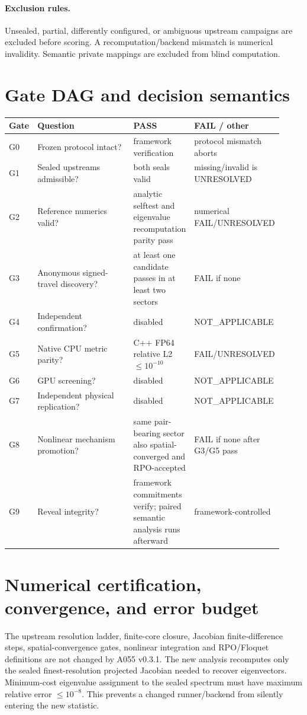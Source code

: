 \documentclass[11pt,a4paper]{article}
\begin{document}
\paragraph{Exclusion rules.}
Unsealed, partial, differently configured, or ambiguous upstream campaigns are excluded before scoring. A recomputation/backend mismatch is numerical invalidity. Semantic private mappings are excluded from blind computation.

\section{Gate DAG and decision semantics}
\begin{longtable}{p{0.07\linewidth}p{0.42\linewidth}p{0.22\linewidth}p{0.21\linewidth}}
\toprule Gate & Question & PASS & FAIL / other \\
\midrule
G0 & Frozen protocol intact? & framework verification & protocol mismatch aborts \\
G1 & Sealed upstreams admissible? & both seals valid & missing/invalid is UNRESOLVED \\
G2 & Reference numerics valid? & analytic selftest and eigenvalue recomputation parity pass & numerical FAIL/UNRESOLVED \\
G3 & Anonymous signed-travel discovery? & at least one candidate passes in at least two sectors & FAIL if none \\
G4 & Independent confirmation? & disabled & NOT\_APPLICABLE \\
G5 & Native CPU metric parity? & C++ FP64 relative L2 $\le10^{-10}$ & FAIL/UNRESOLVED \\
G6 & GPU screening? & disabled & NOT\_APPLICABLE \\
G7 & Independent physical replication? & disabled & NOT\_APPLICABLE \\
G8 & Nonlinear mechanism promotion? & same pair-bearing sector also spatial-converged and RPO-accepted & FAIL if none after G3/G5 pass \\
G9 & Reveal integrity? & framework commitments verify; paired semantic analysis runs afterward & framework-controlled \\
\bottomrule
\end{longtable}

\section{Numerical certification, convergence, and error budget}
The upstream resolution ladder, finite-core closure, Jacobian finite-difference steps, spatial-convergence gates, nonlinear integration and RPO/Floquet definitions are not changed by A055 v0.3.1. The new analysis recomputes only the sealed finest-resolution projected Jacobian needed to recover eigenvectors. Minimum-cost eigenvalue assignment to the sealed spectrum must have maximum relative error $\le10^{-8}$. This prevents a changed runner/backend from silently entering the new statistic.
\end{document}
